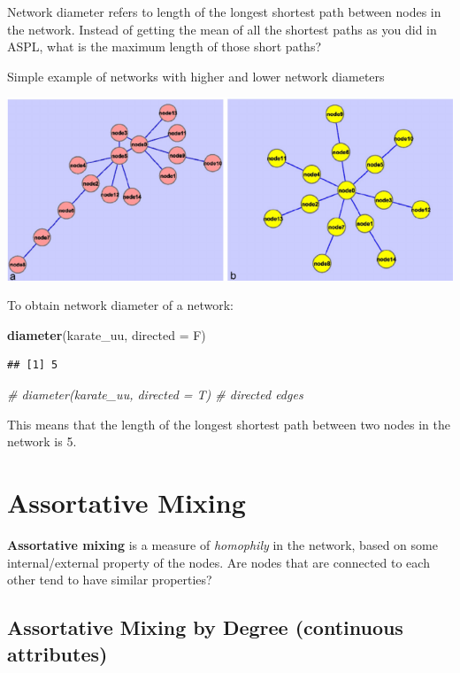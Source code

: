 \documentclass[
]{book}
\newenvironment{Shaded}{\begin{snugshade}}{\end{snugshade}}
\newcommand{\AttributeTok}[1]{\textcolor[rgb]{0.13,0.29,0.53}{#1}}
\newcommand{\CommentTok}[1]{\textcolor[rgb]{0.56,0.35,0.01}{\textit{#1}}}
\newcommand{\FunctionTok}[1]{\textcolor[rgb]{0.13,0.29,0.53}{\textbf{#1}}}
\newcommand{\NormalTok}[1]{#1}
\begin{document}
Network diameter refers to length of the longest shortest path between nodes in the network. Instead of getting the mean of all the shortest paths as you did in ASPL, what is the maximum length of those short paths?

Simple example of networks with higher and lower network diameters

\includegraphics{images/diameter.png}

To obtain network diameter of a network:

\begin{Shaded}
\begin{Highlighting}[]
\FunctionTok{diameter}\NormalTok{(karate\_uu, }\AttributeTok{directed =}\NormalTok{ F)}
\end{Highlighting}
\end{Shaded}

\begin{verbatim}
## [1] 5
\end{verbatim}

\begin{Shaded}
\begin{Highlighting}[]
\CommentTok{\# diameter(karate\_uu, directed = T) \# directed edges }
\end{Highlighting}
\end{Shaded}

This means that the length of the longest shortest path between two nodes in the network is 5.

\section{Assortative Mixing}\label{assortative-mixing}

\textbf{Assortative mixing} is a measure of \emph{homophily} in the network, based on some internal/external property of the nodes. Are nodes that are connected to each other tend to have similar properties?

\subsection{Assortative Mixing by Degree (continuous attributes)}\label{assortative-mixing-by-degree-continuous-attributes}
\end{document}
